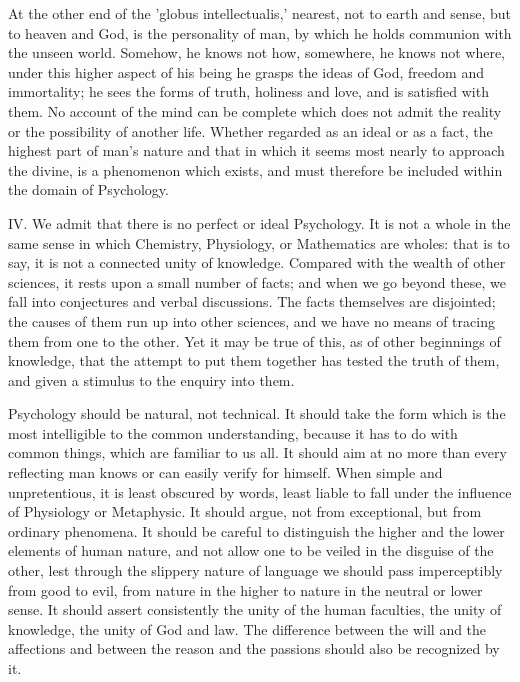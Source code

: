 \documentclass[11pt,letter]{article}
\begin{document}
\par  At the other end of the 'globus intellectualis,' nearest, not to earth and sense, but to heaven and God, is the personality of man, by which he holds communion with the unseen world. Somehow, he knows not how, somewhere, he knows not where, under this higher aspect of his being he grasps the ideas of God, freedom and immortality; he sees the forms of truth, holiness and love, and is satisfied with them. No account of the mind can be complete which does not admit the reality or the possibility of another life. Whether regarded as an ideal or as a fact, the highest part of man's nature and that in which it seems most nearly to approach the divine, is a phenomenon which exists, and must therefore be included within the domain of Psychology.

\par  IV. We admit that there is no perfect or ideal Psychology. It is not a whole in the same sense in which Chemistry, Physiology, or Mathematics are wholes: that is to say, it is not a connected unity of knowledge. Compared with the wealth of other sciences, it rests upon a small number of facts; and when we go beyond these, we fall into conjectures and verbal discussions. The facts themselves are disjointed; the causes of them run up into other sciences, and we have no means of tracing them from one to the other. Yet it may be true of this, as of other beginnings of knowledge, that the attempt to put them together has tested the truth of them, and given a stimulus to the enquiry into them.

\par  Psychology should be natural, not technical. It should take the form which is the most intelligible to the common understanding, because it has to do with common things, which are familiar to us all. It should aim at no more than every reflecting man knows or can easily verify for himself. When simple and unpretentious, it is least obscured by words, least liable to fall under the influence of Physiology or Metaphysic. It should argue, not from exceptional, but from ordinary phenomena. It should be careful to distinguish the higher and the lower elements of human nature, and not allow one to be veiled in the disguise of the other, lest through the slippery nature of language we should pass imperceptibly from good to evil, from nature in the higher to nature in the neutral or lower sense. It should assert consistently the unity of the human faculties, the unity of knowledge, the unity of God and law. The difference between the will and the affections and between the reason and the passions should also be recognized by it.
\end{document}

